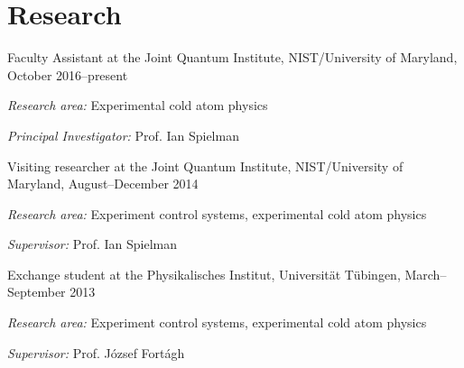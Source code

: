 \documentclass[10pt,letterpaper]{article}
\renewenvironment{itemize}{
  \begin{list}{}{
    \setlength{\leftmargin}{1.5em}
    \setlength{\itemsep}{0.25em}
    \setlength{\parskip}{0pt}
    \setlength{\parsep}{0.25em}
  }
}{
  \end{list}
}
\begin{document}
\section*{Research}
\begin{itemize}

\item{Faculty Assistant at the Joint Quantum Institute, NIST/University of Maryland, October 2016--present}
    \begin{itemize}
      \item \textit{Research area:}
      Experimental cold atom physics
      \item \textit{Principal Investigator:}
      Prof. Ian Spielman
    \end{itemize}

\item{Visiting researcher at the Joint Quantum Institute, NIST/University of Maryland, August--December 2014}
    \begin{itemize}
      \item \textit{Research area:}
      Experiment control systems, experimental cold atom physics
      \item \textit{Supervisor:}
      Prof. Ian Spielman
    \end{itemize}

\item{Exchange student at the Physikalisches Institut, Universität Tübingen, March–September 2013}
    \begin{itemize}
      \item \textit{Research area:}
      Experiment control systems, experimental cold atom physics
      \item \textit{Supervisor:}
      Prof. József Fortágh
    \end{itemize}
    

\end{itemize}
\end{document}
